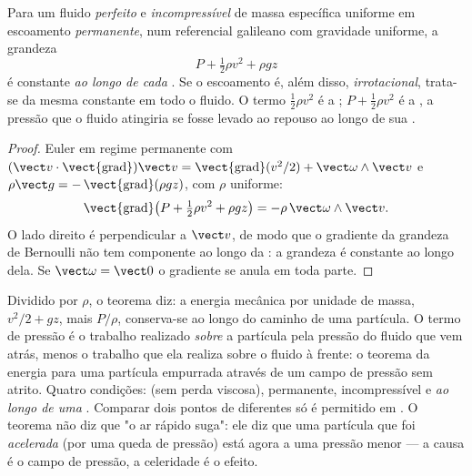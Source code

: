 \begin{theorem}[Bernoulli]\label{thm:b2:euler-bernoulli:bernoulli}
Para um fluido \emph{perfeito} e \emph{incompressível} de massa específica uniforme em
escoamento \emph{permanente}, num referencial galileano com gravidade uniforme, a grandeza
\[
P + \tfrac12\rho v^2 + \rho gz
\]
é constante \emph{ao longo de cada }. Se o escoamento é, além disso,
\emph{irrotacional}, trata-se da mesma constante em todo o fluido. O
termo $\tfrac12\rho v^2$ é a \emph{}; $P + \tfrac12\rho v^2$
é a \emph{}, a pressão que o fluido atingiria
se fosse levado ao repouso ao longo de sua .
\end{theorem}

\begin{proof}
Euler em regime permanente com $(\vect v\cdot\operatorname{\vect{grad}})\vect v =
\operatorname{\vect{grad}}(v^2/2) + \vect\omega\wedge\vect v$ e $\rho\vect g =
-\operatorname{\vect{grad}}(\rho gz)$, com $\rho$ uniforme:
\[
\operatorname{\vect{grad}}\bigl(P + \tfrac12\rho v^2 + \rho gz\bigr) = -\rho\,
\vect\omega\wedge\vect v .
\]
O lado direito é perpendicular a $\vect v$, de modo que o gradiente da
grandeza de Bernoulli não tem componente ao longo da : a grandeza
é constante ao longo dela. Se $\vect\omega = \vect 0$ o gradiente se anula
em toda parte.
\end{proof}

\begin{remark}\label{rem:b2:euler-bernoulli:meaning}
Dividido por $\rho$, o teorema diz: a energia mecânica por unidade de
massa, $v^2/2 + gz$, mais $P/\rho$, conserva-se ao longo do caminho de uma partícula.
O termo de pressão é o trabalho realizado \emph{sobre} a partícula pela
pressão do fluido que vem atrás, menos o trabalho que ela realiza sobre o fluido
à frente: o teorema da energia para uma partícula empurrada através de um campo
de pressão sem atrito. Quatro condições:  (sem perda
viscosa), permanente, incompressível e \emph{ao longo de uma }. Comparar
dois pontos de  diferentes só é permitido em . O teorema não diz que "o ar rápido suga": ele diz que uma partícula que
foi \emph{acelerada} (por uma queda de pressão) está agora a uma pressão
menor --- a causa é o campo de pressão, a celeridade é o efeito.
\end{remark}


